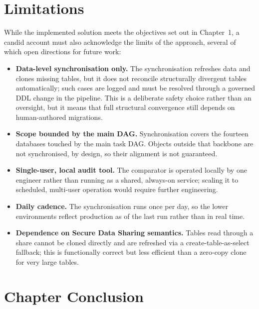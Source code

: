 \section{Limitations}
\label{sec:impl-limitations}

While the implemented solution meets the objectives set out in Chapter~1, a candid account must also acknowledge the limits of the approach, several of which open directions for future work:

\begin{itemize}
  \item \textbf{Data-level synchronisation only.} The synchronisation refreshes data and clones missing tables, but it does not reconcile structurally divergent tables automatically; such cases are logged and must be resolved through a governed DDL change in the pipeline. This is a deliberate safety choice rather than an oversight, but it means that full structural convergence still depends on human-authored migrations.
  \item \textbf{Scope bounded by the main DAG.} Synchronisation covers the fourteen databases touched by the main task DAG. Objects outside that backbone are not synchronised, by design, so their alignment is not guaranteed.
  \item \textbf{Single-user, local audit tool.} The comparator is operated locally by one engineer rather than running as a shared, always-on service; scaling it to scheduled, multi-user operation would require further engineering.
  \item \textbf{Daily cadence.} The synchronisation runs once per day, so the lower environments reflect production as of the last run rather than in real time.
  \item \textbf{Dependence on Secure Data Sharing semantics.} Tables read through a share cannot be cloned directly and are refreshed via a create-table-as-select fallback; this is functionally correct but less efficient than a zero-copy clone for very large tables.
\end{itemize}

\section*{Chapter Conclusion}

